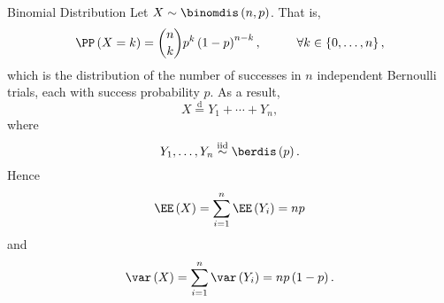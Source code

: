 \documentclass[stat901]{subfiles}
\begin{document}
    \begin{example}{Binomial Distribution}
        Let $X\sim\binomdis\left( n,p \right)$. That is,
        \begin{equation*}
            \PP\left( X=k \right) = \binom{n}{k} p^k\left( 1-p \right)^{n-k}, \hspace{1cm}\forall k\in\left\lbrace 0,\ldots,n \right\rbrace,
        \end{equation*}
        which is the distribution of the number of successes in $n$ independent Bernoulli trials, each with success probability $p$. As a result,
        \begin{equation*}
            X \overset{\text{d}}{=} Y_1+\cdots+Y_n,
        \end{equation*}
        where
        \begin{equation*}
            Y_1,\ldots,Y_n\overset{\text{iid}}{\sim}\berdis\left( p \right).
        \end{equation*}
        Hence
        \begin{equation*}
            \EE\left( X \right) = \sum^{n}_{i=1}\EE\left( Y_i \right) = np
        \end{equation*}
        and
        \begin{equation*}
            \var\left( X \right) = \sum^{n}_{i=1}\var\left( Y_i \right) = np\left( 1-p \right).
        \end{equation*}
    \end{example}

    \rruleline
    
    
    
    
    
    
    
    
    
    
    
    
    
    
    
    
    
    
    
    
    
    
    
    
    
    
    
    
    
\end{document}
